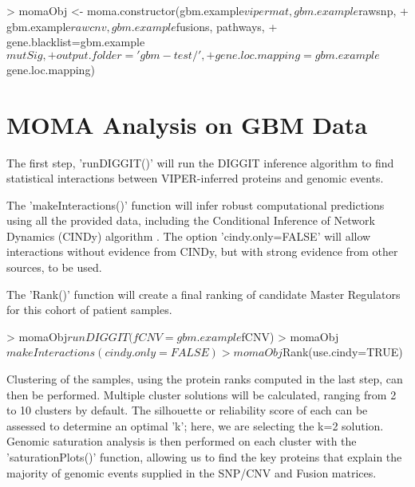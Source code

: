 \documentclass{article}
\begin{document}
\par   
\linebreak

\begin{Schunk}
\begin{Sinput}
> momaObj <- moma.constructor(gbm.example$vipermat, gbm.example$rawsnp,
+         gbm.example$rawcnv, gbm.example$fusions, pathways,
+         gene.blacklist=gbm.example$mutSig,
+         output.folder='gbm-test/',
+         gene.loc.mapping=gbm.example$gene.loc.mapping)
\end{Sinput}
\end{Schunk}

\section{MOMA Analysis on GBM Data}

The first step, 'runDIGGIT()'  will run the DIGGIT inference algorithm \cite{diggit} to find
statistical interactions between VIPER-inferred proteins and genomic events.

\par
\linebreak

The 'makeInteractions()' function will infer robust computational predictions
using all the provided data, including the Conditional Inference of Network Dynamics 
(CINDy) algorithm \cite{cindy}.
The option 'cindy.only=FALSE' will allow interactions without evidence from CINDy, but 
with strong evidence from other
sources, to be used.

\par
\linebreak

The 'Rank()' function will create a final ranking of candidate Master Regulators for this cohort of patient samples.

\begin{Schunk}
\begin{Sinput}
> momaObj$runDIGGIT(fCNV=gbm.example$fCNV)
> momaObj$makeInteractions(cindy.only=FALSE)
> momaObj$Rank(use.cindy=TRUE)
\end{Sinput}
\end{Schunk}

\par
\linebreak

Clustering of the samples, using the protein ranks computed in the last step, can then be performed. Multiple cluster solutions will be calculated, ranging from 2 to 10 clusters by default. The silhouette or reliability score of each can be assessed to determine an optimal 'k'; here, we are selecting the k=2 solution. Genomic saturation analysis is then performed on each cluster with the 'saturationPlots()' function, allowing us to find the key proteins that explain the majority of genomic events supplied in the SNP/CNV and Fusion matrices.
\end{document}
